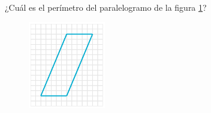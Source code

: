 
¿Cuál es el perímetro del paralelogramo de la figura \ref{fig:peri_paralelogramo_03}?
\begin{figure}[H]
    \begin{center}
        \includegraphics[width=0.3\textwidth]{../images/peri_paralelogramo_03.png}
    \end{center}
    \caption{}
    \label{fig:peri_paralelogramo_03}
\end{figure}